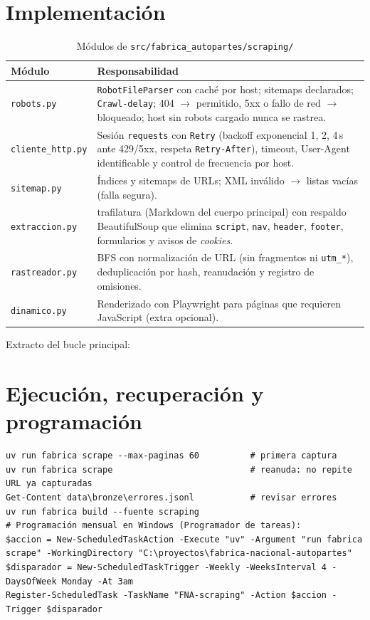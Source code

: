 \section{Implementación}
\begin{table}[H]\centering\small
\caption{Módulos de \texttt{src/fabrica\_autopartes/scraping/}}\label{tab:modulos-scraping}
\begin{tabularx}{\linewidth}{@{}l X@{}}\toprule
Módulo & Responsabilidad\\\midrule
\texttt{robots.py} & \texttt{RobotFileParser} con caché por host; sitemaps declarados; \texttt{Crawl-delay}; 404
$\rightarrow$ permitido, 5xx o fallo de red $\rightarrow$ bloqueado; host sin robots cargado nunca se rastrea.\\
\texttt{cliente\_http.py} & Sesión \texttt{requests} con \texttt{Retry} (backoff exponencial 1, 2, 4\,s ante
429/5xx, respeta \texttt{Retry-After}), timeout, User-Agent identificable y control de frecuencia por host.\\
\texttt{sitemap.py} & Índices y sitemaps de URLs; XML inválido $\rightarrow$ listas vacías (falla segura).\\
\texttt{extraccion.py} & trafilatura (Markdown del cuerpo principal) con respaldo BeautifulSoup que elimina
\texttt{script}, \texttt{nav}, \texttt{header}, \texttt{footer}, formularios y avisos de \emph{cookies}.\\
\texttt{rastreador.py} & BFS con normalización de URL (sin fragmentos ni \texttt{utm\_*}), deduplicación por
hash, reanudación y registro de omisiones.\\
\texttt{dinamico.py} & Renderizado con Playwright para páginas que requieren JavaScript (extra opcional).\\\bottomrule
\end{tabularx}
\end{table}

Extracto del bucle principal:


\section{Ejecución, recuperación y programación}
\begin{lstlisting}[style=ps]
uv run fabrica scrape --max-paginas 60          # primera captura
uv run fabrica scrape                           # reanuda: no repite URL ya capturadas
Get-Content data\bronze\errores.jsonl           # revisar errores
uv run fabrica build --fuente scraping
# Programación mensual en Windows (Programador de tareas):
$accion = New-ScheduledTaskAction -Execute "uv" -Argument "run fabrica scrape" -WorkingDirectory "C:\proyectos\fabrica-nacional-autopartes"
$disparador = New-ScheduledTaskTrigger -Weekly -WeeksInterval 4 -DaysOfWeek Monday -At 3am
Register-ScheduledTask -TaskName "FNA-scraping" -Action $accion -Trigger $disparador
\end{lstlisting}

